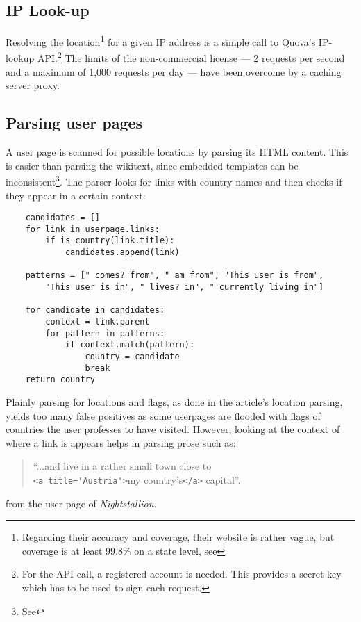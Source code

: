 \subsection{IP Look-up}\label{sub:iplookup}

Resolving the location\footnote{Regarding their accuracy and coverage, their website is rather vague, but coverage is at least 99.8\% on a state level, see } for a given IP address is a simple call to Quova's IP-lookup API.\footnote{For the API call, a registered account is needed. This provides a secret key which has to be used to sign each request.}
The limits of the non-commercial license --- 2 requests per second and a maximum of 1,000 requests per day --- have been overcome by a caching server proxy.


\subsection{Parsing user pages}\label{sub:parsinguserpages}

A user page is scanned for possible locations by parsing its HTML content.
This is easier than parsing the wikitext, since embedded templates can be inconsistent\footnote{See }.
The parser looks for links with country names and then checks if they appear in a certain context:

\begin{lstlisting}
	candidates = []
	for link in userpage.links:
		if is_country(link.title):
			candidates.append(link)

	patterns = [" comes? from", " am from", "This user is from", 
		"This user is in", " lives? in", " currently living in"]
		
	for candidate in candidates:
		context = link.parent
		for pattern in patterns:
			if context.match(pattern):
				country = candidate
				break
	return country
\end{lstlisting}

Plainly parsing for locations and flags, as done in the article's location parsing, yields too many false positives as some userpages are flooded with flags of countries the user professes to have visited.
However, looking at the context of where a link is appears helps in parsing prose such as:
\begin{quotation}
 ``...and live in a rather small town close to \\\verb"<a title='Austria'>"my country's\verb"</a>" capital''.
\end{quotation}
from the user page of \emph{Nightstallion}.

